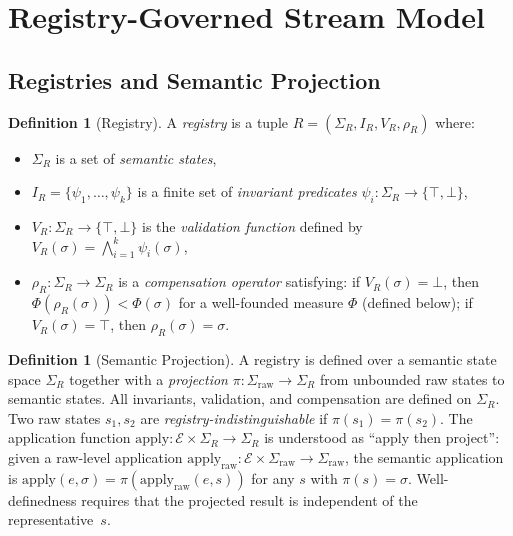 \documentclass[11pt,a4paper]{article}
\theoremstyle{plain}
\theoremstyle{definition}
\newtheorem{definition}[theorem]{Definition}
\theoremstyle{remark}
\begin{document}
\section{Registry-Governed Stream Model}
\label{sec:model}

\subsection{Registries and Semantic Projection}

\begin{definition}[Registry]
\label{def:registry}
A \emph{registry} is a tuple $R = (\Sigma_R, I_R, V_R, \rho_R)$ where:
\begin{itemize}[leftmargin=*,nosep]
\item $\Sigma_R$ is a set of \emph{semantic states},
\item $I_R = \{\psi_1, \ldots, \psi_k\}$ is a finite set of \emph{invariant
  predicates} $\psi_i: \Sigma_R \to \{\top, \bot\}$,
\item $V_R: \Sigma_R \to \{\top, \bot\}$ is the \emph{validation function}
  defined by $V_R(\sigma) = \bigwedge_{i=1}^k \psi_i(\sigma)$,
\item $\rho_R: \Sigma_R \to \Sigma_R$ is a \emph{compensation operator}
  satisfying: if $V_R(\sigma) = \bot$, then $\Phi(\rho_R(\sigma)) < \Phi(\sigma)$
  for a well-founded measure $\Phi$ (defined below); if
  $V_R(\sigma) = \top$, then $\rho_R(\sigma) = \sigma$.
\end{itemize}
\end{definition}

\begin{definition}[Semantic Projection]
\label{def:projection}
A registry is defined over a semantic state space $\Sigma_R$ together with
a \emph{projection} $\pi: \Sigma_{\mathrm{raw}} \to \Sigma_R$ from
unbounded raw states to semantic states.  All invariants, validation, and
compensation are defined on $\Sigma_R$.  Two raw states $s_1, s_2$ are
\emph{registry-indistinguishable} if $\pi(s_1) = \pi(s_2)$.
The application function $\mathrm{apply}: \mathcal{E} \times \Sigma_R \to \Sigma_R$
is understood as ``apply then project'': given a raw-level application
$\mathrm{apply}_{\mathrm{raw}}: \mathcal{E} \times \Sigma_{\mathrm{raw}} \to \Sigma_{\mathrm{raw}}$,
the semantic application is
$\mathrm{apply}(e, \sigma) = \pi(\mathrm{apply}_{\mathrm{raw}}(e, s))$ for
any $s$ with $\pi(s) = \sigma$.  Well-definedness requires that the projected
result is independent of the representative~$s$.
\end{definition}
\end{document}
